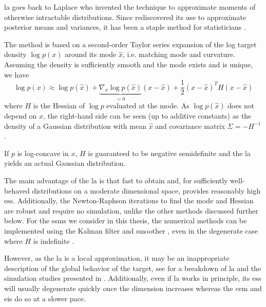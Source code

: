 \acrfull{la} goes back to Laplace \cite{Laplace1986Memoir} who invented the technique to approximate moments of otherwise intractable distributions. Since \cite{Tierney1986Accurate,Tierney1989Fully} rediscovered its use to approximate posterior means and variances, it has been a staple method for statisticians .

The method is based on a second-order Taylor series expansion of the log target density $\log p(x)$ around its mode $\hat x$, i.e. matching mode and curvature. Assuming the density is sufficiently smooth and the mode exists and is unique, we have
$$
\log p(x) \approx \log p(\hat x) + \underbrace{\nabla_{x} \log p (\hat x)}_{= 0} \left( x - \hat x \right) + \frac{1}{2} (x - \hat x)^{T} H (x - \hat x)
$$
where $H$ is the Hessian of $\log p$ evaluated at the mode. As $\log p (\hat x)$ does not depend on $x$, the right-hand side can be seen (up to additive constants) as the density of a Gaussian distribution with mean $\hat x$ and covariance matrix $\Sigma = - H^{-1}$. 

If $p$ is log-concave in $x$, $H$ is guaranteed to be negative semidefinite and the \gls{la} yields an actual Gaussian distribution. 


The main advantage of the \gls{la} is that fast to obtain and, for sufficiently well-behaved distributions on a moderate dimensional space, provides reasonably high \gls{ess}. Additionally, the Newton-Raphson iterations to find the mode and Hessian are robust and require no simulation, unlike the other methods discussed further below.
For the \glspl{ssm} we consider in this thesis, the numerical methods can be implemented using the Kalman filter and smoother \cite{Shephard1997Likelihood,Durbin1997Monte}, even in the degenerate case where $H$ is indefinite \cite{Jungbacker2007Monte}.

However, as the \gls{la} is a local approximation, it may be an inappropriate description of the global behavior of the target, see  for a breakdown of \gls{la} and the simulation studies presented in . 
Additionally, even if \gls{la} works in principle, its \gls{ess} will usually degenerate quickly once the dimension increases whereas the \gls{cem} and \gls{eis} do so at a slower pace.

